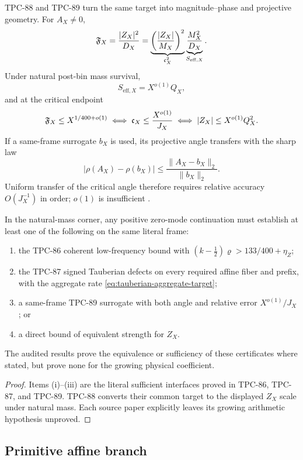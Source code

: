 TPC-88 and TPC-89 turn the same target into magnitude--phase and
projective geometry.  For \(A_X\ne0\),
\[
 \mathfrak F_X
 =
 \frac{|Z_X|^2}{D_X}
 =
 \underbrace{\left(\frac{|Z_X|}{M_X}\right)^2}_{\mathfrak c_X^2}
 \underbrace{\frac{M_X^2}{D_X}}_{S_{\mathrm{eff},X}}.
\]
Under natural post-bin mass survival,
\[
 S_{\mathrm{eff},X}=X^{o(1)}Q_X,
\]
and at the critical endpoint
\[
 \mathfrak F_X\le X^{1/400+o(1)}
 \iff
 \mathfrak c_X\le\frac{X^{o(1)}}{J_X}
 \iff
 |Z_X|\le X^{o(1)}Q_X^2.
\]
If a same-frame surrogate \(b_X\) is used, its projective angle
transfers with the sharp law
\[
 |\rho(A_X)-\rho(b_X)|
 \le
 \frac{\|A_X-b_X\|_2}{\|b_X\|_2}.
\]
Uniform transfer of the critical angle therefore requires relative
accuracy \(O(J_X^{-1})\) in order; \(o(1)\) is insufficient
\citep{WangTPC88,WangTPC89}.

\begin{theorem}
\label{thm:zero-mode-fork}
In the natural-mass corner, any positive zero-mode continuation must
establish at least one of the following on the same literal frame:
\begin{enumerate}[label=(\roman*),leftmargin=2.2em]
\item the TPC-86 coherent low-frequency bound with
  \((k-\tfrac12)\varrho>133/400+\eta_Z\);
\item the TPC-87 signed Tauberian defects on every required affine
  fiber and prefix, with the aggregate rate
  \eqref{eq:tauberian-aggregate-target};
\item a same-frame TPC-89 surrogate with both angle and relative
  error \(X^{o(1)}/J_X\); or
\item a direct bound of equivalent strength for \(Z_X\).
\end{enumerate}
The audited results prove the equivalence or sufficiency of these
certificates where stated, but prove none for the growing physical
coefficient.
\end{theorem}

\begin{proof}
Items (i)--(iii) are the literal sufficient interfaces proved in
TPC-86, TPC-87, and TPC-89.  TPC-88 converts their common target to
the displayed \(Z_X\) scale under natural mass.  Each source paper
explicitly leaves its growing arithmetic hypothesis unproved.
\end{proof}

\subsection{Primitive affine branch}

